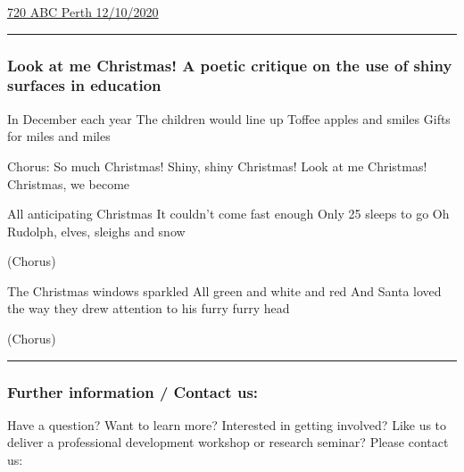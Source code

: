 \documentclass[
]{article}
\begin{document}
\href{https://mms.tveyes.com/mediaview/?U3RhdGlvbj04Njc1JlN0YXJ0RGF0ZVRpbWU9MTAlMkYxMiUyRjIwMjAlMjAwNSUzQTM2JTNBNDUmRW5kRGF0ZVRpbWU9MTAlMkYxMiUyRjIwMjAlMjAwNSUzQTQ2JTNBNDUmUGxheVN0YXJ0UmVnZXg9JTVDYkRyJTVDYiU3QyU1Q2JSTUlUJTVDYiZQbGF5U3RhcnRSZWdleFByZXJvbGw9MTUmRHVyYXRpb249Mjk4ODkwJlBhcnRuZXJJRD03MzEzJkV4cGlyYXRpb249MTAlMkYxMyUyRjIwMjAlMjAwNiUzQTIxJTNBNDImSGlnaGxpZ2h0UmVnZXg9JTVDYkRyJTVDYiU3QyU1Q2JSTUlUJTVDYiZNb2RFZGl0b3JFbmFibGU9dHJ1ZSZNb2RFZGl0b3JEZXN0aW5hdGlvbnM9NCZzaWduYXR1cmU9YWVlNjhjYzFhNzlkNDZlMGExMjRmYzMxMjU1NzQ2Njc=\#}{720
ABC Perth 12/10/2020}

\begin{center}\rule{0.5\linewidth}{0.5pt}\end{center}

\hypertarget{look-at-me-christmas-a-poetic-critique-on-the-use-of-shiny-surfaces-in-education}{%
\subsubsection{Look at me Christmas! A poetic critique on the use of
shiny surfaces in
education}\label{look-at-me-christmas-a-poetic-critique-on-the-use-of-shiny-surfaces-in-education}}

In December each year The children would line up Toffee apples and
smiles Gifts for miles and miles

Chorus: So much Christmas! Shiny, shiny Christmas! Look at me Christmas!
Christmas, we become

All anticipating Christmas It couldn't come fast enough Only 25 sleeps
to go Oh Rudolph, elves, sleighs and snow

(Chorus)

The Christmas windows sparkled All green and white and red And Santa
loved the way they drew attention to his furry furry head

(Chorus)

\begin{center}\rule{0.5\linewidth}{0.5pt}\end{center}

\hypertarget{further-information-contact-us}{%
\subsubsection{Further information / Contact
us:}\label{further-information-contact-us}}

Have a question? Want to learn more? Interested in getting involved?
Like us to deliver a professional development workshop or research
seminar? Please contact us:
\end{document}
